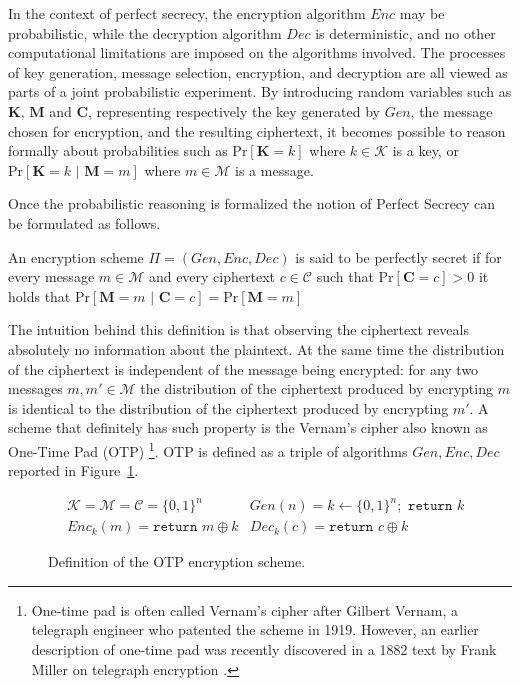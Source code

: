 In the context of perfect secrecy, the encryption algorithm  $Enc$ may be probabilistic, while the decryption algorithm $Dec$ is deterministic, and no other computational limitations are imposed on the algorithms involved. The processes of key generation, message selection, encryption, and decryption are all viewed as parts of a joint probabilistic experiment. By introducing random variables such as $\mathbf{K}$, $\mathbf{M}$ and $\mathbf{C}$, representing respectively the key generated by $Gen$, the message chosen for encryption, and the resulting ciphertext, it becomes possible to reason formally about probabilities such as $\mathrm{Pr}[\mathbf{K} = k]$ where $k \in \mathcal{K}$ is a key, or $\mathrm{Pr}[\mathbf{K} = k\,\,|\,\,\mathbf{M} = m]$ where $m \in \mathcal{M}$ is a message.

Once the probabilistic reasoning is formalized the notion of Perfect Secrecy can be formulated as follows.
\begin{definition}
    An encryption scheme $\Pi = (Gen, Enc, Dec)$ is said to be perfectly secret if for every message $m \in \mathcal{M}$ and every ciphertext $c \in \mathcal{C}$ such that $\mathrm{Pr}[\mathbf{C} = c] > 0$ it holds that $\mathrm{Pr}[\mathbf{M} = m\,\,|\,\, \mathbf{C} = c] = \mathrm{Pr}[\mathbf{M} = m]$
\end{definition}
The intuition behind this definition is that observing the ciphertext reveals absolutely no information about the plaintext. At the same time the distribution of the ciphertext is independent of the message being encrypted: for any two messages $m, m'\in \mathcal{M}$ the distribution of the ciphertext produced by encrypting $m$ is identical to the distribution of the ciphertext produced by encrypting $m'$. A scheme that definitely has such property is the Vernam's cipher also known as One-Time Pad (OTP) \footnote{One-time pad is often called Vernam’s cipher after Gilbert Vernam, a telegraph engineer who patented the scheme in 1919. However, an earlier description of one-time pad was recently discovered in a 1882 text by Frank Miller on telegraph encryption \cite{Bellovin01072011}.}. OTP is defined as a triple of algorithms $Gen, Enc, Dec$ reported in Figure~\ref{fig:otp}.
\begin{figure}[htpb]
    \centering
    \begin{align*}
    &\mathcal{K} = \mathcal{M} = \mathcal{C} = \{0,1\}^n &Gen(n) = k \gets \{0,1\}^n;\,\,\mathtt{return}\,\,k \\
    &Enc_k(m) = \mathtt{return}\,\, m \oplus k
    &Dec_k(c) = \mathtt{return}\,\, c \oplus k
    \end{align*}
    \caption{Definition of the OTP encryption scheme.}
    \label{fig:otp}
\end{figure}


